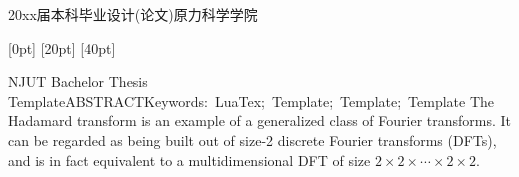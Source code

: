 \documentclass[a4paper]{article}
\begin{document}
	\begin{titlepage}{20xx届本科毕业设计(论文)}{原力科学学院}
	\end{titlepage}
	[0pt]{\fontsize{14pt}{24pt}\selectfont\simhei\boldmath}%
	{\contentslabel{2.5em}}{}%
	{\unboldmath\titlerule*[0.5pc]{$\cdot$}{\fontsize{12pt}{24pt}\selectfont\simsun\contentspage}\hspace*{0pt}}%
	[20pt]{\fontsize{12pt}{24pt}\selectfont\simsun}%
	{\contentslabel{2.5em}}{}%
	{\titlerule*[0.5pc]{$\cdot$}\contentspage\hspace*{0pt}}%
	[40pt]{\fontsize{12pt}{24pt}\selectfont\simsun}%
	{\contentslabel{2.5em}}{}%
	{\titlerule*[0.5pc]{$\cdot$}\contentspage\hspace*{0pt}}%
	\begingroup{}
	\begin{abstract}{南京工业大学本科生毕业论文LuaTex模版}{摘要}{关键词：}{LuaTex\ \ 模版\ \ 模版\ \ 模版}
		本模板旨在加速本科论文撰写，减少调整格式的时间。但目前模版大部分设想未实现，只适合普通本科论文。\par
		所有格式定义文件都在\gqq{}./style\cqq{}目录下。其中.tex为宏命令，为用户调用模版功能的接口。而.lua文件为绝大部分宏命令的具体实现。\par
	\end{abstract}
	\begin{abstractE}{NJUT Bachelor Thesis Template}{ABSTRACT}{Keywords:\ }{LuaTex;\ Template;\ Template;\ Template}
	   The Hadamard transform is an example of a generalized class of Fourier transforms. It can be regarded as being built out of size-2 discrete Fourier transforms (DFTs), and is in fact equivalent to a multidimensional DFT of size $2\times2\times\cdots\times2\times2$.\par
	\end{abstractE}
	\endgroup
	\newpage
	\setcounter{page}{1}
\end{document}
